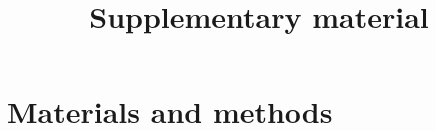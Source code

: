 \documentclass[12pt]{article}
\title{Supplementary material}
\author
{
}
\date{}
\newenvironment{sciabstract}{%
\begin{quote} \bf}
{\end{quote}}
\begin{document}
 


\baselineskip24pt


\maketitle 








\section*{Materials and methods}
\end{document}
